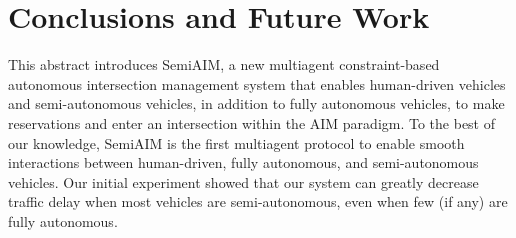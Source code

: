 \section{Conclusions and Future Work}
\label{sec:conclusions}

This abstract introduces SemiAIM, a new multiagent constraint-based
autonomous intersection management system that enables human-driven
vehicles and semi-autonomous vehicles, in addition to fully autonomous
vehicles, to make reservations and enter an intersection within the
AIM paradigm.  To the best of our knowledge, SemiAIM is the first
multiagent protocol to enable smooth interactions between
human-driven, fully autonomous, and semi-autonomous vehicles.  Our
initial
experiment showed that our system can greatly decrease
traffic delay when most vehicles are semi-autonomous, even when few
(if any) are fully autonomous.

